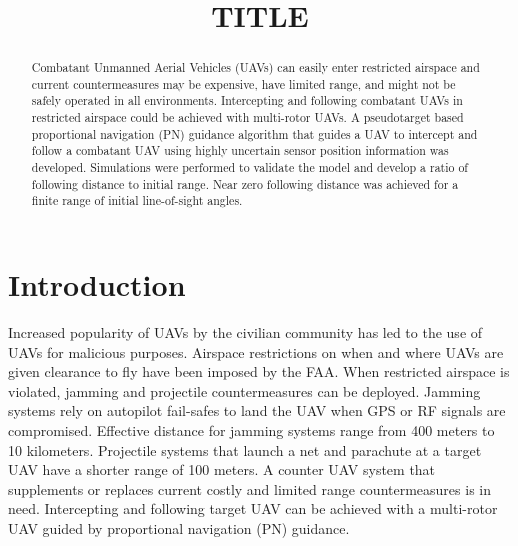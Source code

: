 \documentclass[conference]{IEEEtran}
\begin{document}
\title{TITLE}

\author{
\and
{}
}

\maketitle


\begin{abstract}
	Combatant Unmanned Aerial Vehicles (UAVs) can easily enter restricted airspace and current countermeasures may be expensive, have limited range, and might not be safely operated in all environments. Intercepting and following combatant UAVs in restricted airspace could be achieved with multi-rotor UAVs. A pseudotarget based proportional navigation (PN) guidance algorithm that guides a UAV to intercept and follow a combatant UAV using highly uncertain sensor position information was developed. Simulations were performed to validate the model and develop a ratio of following distance to initial range. Near zero following distance was achieved for a finite range of initial line-of-sight angles.
\end{abstract}

\begin{IEEEkeywords}

\end{IEEEkeywords}

\section{Introduction}

Increased popularity of UAVs by the civilian community has led to the use of UAVs for malicious purposes. Airspace restrictions on when and where UAVs are given clearance to fly have been imposed by the FAA. When restricted airspace is violated, jamming and projectile countermeasures can be deployed. Jamming systems rely on autopilot fail-safes to land the UAV when GPS or RF signals are compromised. Effective distance for jamming systems range from 400 meters to 10 kilometers. Projectile systems that launch a net and parachute at a target UAV have a shorter range of 100 meters. A counter UAV system that supplements or replaces current costly and limited range countermeasures is in need. Intercepting and following target UAV can be achieved with a multi-rotor UAV guided by proportional navigation (PN) guidance.
\end{document}
